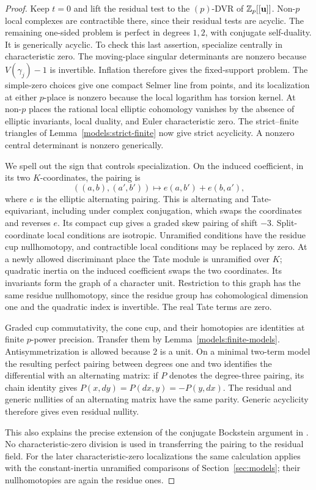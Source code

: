 \begin{proof}
Keep $t=0$ and lift the residual test to the $(p)$-DVR of
$\mathbb Z_p[[\mathbf u]]$.  Non-$p$ local complexes are contractible
there, since their residual tests are acyclic.  The remaining
one-sided problem is perfect in degrees $1,2$, with conjugate
self-duality.  It is generically acyclic.  To check this last
assertion, specialize centrally in characteristic zero.  The
moving-place singular determinants are nonzero because
$V(\gamma_j)-1$ is invertible.  Inflation therefore gives the
fixed-support problem.  The simple-zero choices give one compact
Selmer line from points, and its localization at either $p$-place
is nonzero because the local logarithm has torsion kernel.  At
non-$p$ places the rational local elliptic cohomology vanishes by
the absence of elliptic invariants, local duality, and Euler
characteristic zero.  The strict--finite triangles of
Lemma~\ref{models:strict-finite} now give strict acyclicity.  A
nonzero central determinant is nonzero generically.

We spell out the sign that controls specialization.  On the induced
coefficient, in its two $K$-coordinates, the pairing is
\begin{equation}\label{vertical:induced-pairing}
 ((a,b),(a',b'))\longmapsto e(a,b')+e(b,a'),
\end{equation}
where $e$ is the elliptic alternating pairing.  This is alternating
and Tate-equivariant, including under complex conjugation, which
swaps the coordinates and reverses $e$.  Its compact cup gives a
graded skew pairing of shift $-3$.  Split-coordinate local
conditions are isotropic.  Unramified conditions have the residue
cup nullhomotopy, and contractible local conditions may be replaced
by zero.  At a newly allowed discriminant place the Tate module is
unramified over $K$; quadratic inertia on the induced coefficient
swaps the two coordinates.  Its invariants form the graph of a
character unit.  Restriction to this graph has the same residue
nullhomotopy, since the residue group has cohomological dimension
one and the quadratic index is invertible.  The real Tate terms
are zero.

Graded cup commutativity, the cone cup, and their homotopies are
identities at finite $p$-power precision.  Transfer them by
Lemma~\ref{models:finite-models}.  Antisymmetrization is allowed
because $2$ is a unit.  On a minimal two-term model the resulting
perfect pairing between degrees one and two identifies the
differential with an alternating matrix: if $P$ denotes the
degree-three pairing, its chain identity gives
$P(x,dy)=P(dx,y)=-P(y,dx)$.  The residual and generic nullities of
an alternating matrix have the same parity.  Generic acyclicity
therefore gives even residual nullity.

This also explains the precise extension of the conjugate
Bockstein argument in \cite[Lemma 12.1 and Corollary 12.2]{B}.
No characteristic-zero division is used in
transferring the pairing to the residual field.  For the later
characteristic-zero localizations the same calculation applies
with the constant-inertia unramified comparisons of
Section~\ref{sec:models}; their nullhomotopies are again the
residue ones.
\end{proof}

